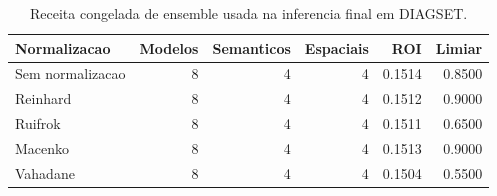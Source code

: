 \begin{table}[!htb]
\centering
\caption{Receita congelada de ensemble usada na inferencia final em DIAGSET.}
\label{tab:results_diagset-ensemble-summary}
\small
\begin{tabular}{lrrrrr}
\toprule
Normalizacao & Modelos & Semanticos & Espaciais & ROI & Limiar \\
\midrule
Sem normalizacao & 8 & 4 & 4 & 0.1514 & 0.8500 \\
Reinhard & 8 & 4 & 4 & 0.1512 & 0.9000 \\
Ruifrok & 8 & 4 & 4 & 0.1511 & 0.6500 \\
Macenko & 8 & 4 & 4 & 0.1513 & 0.9000 \\
Vahadane & 8 & 4 & 4 & 0.1504 & 0.5500 \\
\bottomrule
\end{tabular}
\end{table}
